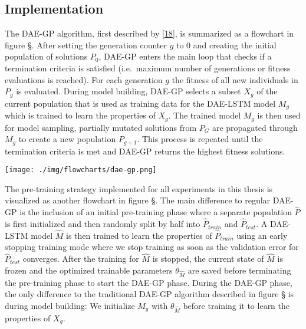 \documentclass[
  11pt,
]{article}
\let\origfigure\figure
\let\endorigfigure\endfigure
\renewenvironment{figure}[1][2] {
    \expandafter\origfigure\expandafter[H]
} {
    \endorigfigure
}
\begin{document}
\hypertarget{implementation}{%
\subsection{Implementation}\label{implementation}}

The DAE-GP algorithm, first described by
{[}\protect\hyperlink{ref-dae-gp_2020_rtree}{18}{]}, is summarized as a
flowchart in figure §. After setting the generation counter \(g\) to
\(0\) and creating the initial population of solutions \(P_0\), DAE-GP
enters the main loop that checks if a termination criteria is satisfied
(i.e.~maximum number of generations or fitness evaluations is reached).
For each generation \(g\) the fitness of all new individuals in \(P_g\)
is evaluated. During model building, DAE-GP selects a subset \(X_g\) of
the current population that is used as training data for the DAE-LSTM
model \(M_g\) which is trained to learn the properties of \(X_g\). The
trained model \(M_g\) is then used for model sampling, partially mutated
solutions from \(P_G\) are propagated through \(M_g\) to create a new
population \(P_{g+1}\). This process is repeated until the termination
criteria is met and DAE-GP returns the highest fitness solutions.

\begin{figure}
\centering
\texttt{[image: ./img/flowcharts/dae-gp.png]}
\caption{Flowchart - Regular DAE-GP}
\end{figure}

The pre-training strategy implemented for all experiments in this thesis
is visualized as another flowchart in figure §. The main difference to
regular DAE-GP is the inclusion of an initial pre-training phase where a
separate population \(\hat{P}\) is first initialized and then randomly
split by half into \(\hat{P}_{train}\) and \(\hat{P}_{test}\). A
DAE-LSTM model \(\hat{M}\) is then trained to learn the properties of
\(\hat{P}_{train}\) using an early stopping training mode where we stop
training as soon as the validation error for \(\hat{P}_{test}\)
converges. After the training for \(\hat{M}\) is stopped, the current
state of \(\hat{M}\) is frozen and the optimized trainable parameters
\(\theta_{\hat{M}}\) are saved before terminating the pre-training phase
to start the DAE-GP phase. During the DAE-GP phase, the only difference
to the traditional DAE-GP algorithm described in figure § is during
model building: We initialize \(M_g\) with \(\theta_{\hat{M}}\) before
training it to learn the properties of \(X_g\).
\end{document}
